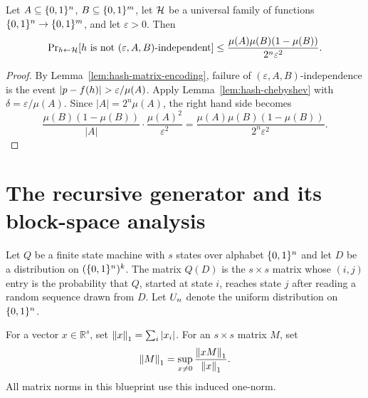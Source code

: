 \begin{lemma}
  \label{lem:universal-hash-independence}
  Let $A \subseteq \{0,1\}^n$, $B \subseteq \{0,1\}^m$, let $\mathcal{H}$ be a universal
  family of functions $\{0,1\}^n \to \{0,1\}^m$, and let $\varepsilon>0$. Then
  \[
    \operatorname{Pr}_{h \leftarrow \mathcal{H}}
    [h \text{ is not }(\varepsilon,A,B)\text{-independent}]
    \le
    \frac{\mu(A)\mu(B)(1-\mu(B))}{2^n\varepsilon^2}.
  \]
\end{lemma}
\begin{proof}
  By Lemma~\ref{lem:hash-matrix-encoding}, failure of
  $(\varepsilon,A,B)$-independence is the event
  $\abs{p-f(h)}>\varepsilon/\mu(A)$. Apply
  Lemma~\ref{lem:hash-chebyshev} with
  $\delta=\varepsilon/\mu(A)$. Since $|A|=2^n\mu(A)$, the right hand side
  becomes
  \[
    \frac{\mu(B)(1-\mu(B))}{|A|}\cdot\frac{\mu(A)^2}{\varepsilon^2}
    =\frac{\mu(A)\mu(B)(1-\mu(B))}{2^n\varepsilon^2}.
  \]
\end{proof}

\chapter{The recursive generator and its block-space analysis}

\begin{definition}
  \label{def:q-distribution}
  Let $Q$ be a finite state machine with $s$ states over alphabet $\{0,1\}^n$ and
  let $D$ be a distribution on $(\{0,1\}^n)^k$. The matrix $Q(D)$ is the
  $s \times s$ matrix whose $(i,j)$ entry is the probability that $Q$, started
  at state $i$, reaches state $j$ after reading a random sequence drawn from
  $D$. Let $U_n$ denote the uniform distribution on $\{0,1\}^n$.
\end{definition}

\begin{definition}
  \label{def:one-norms}
  For a vector $x \in \mathbb R^s$, set $\left\|x\right\|_1=\sum_i |x_i|$. For an
  $s \times s$ matrix $M$, set
  \[
    \left\|M\right\|_1=\sup_{x \ne 0}\frac{\left\|xM\right\|_1}{\left\|x\right\|_1}.
  \]
  All matrix norms in this blueprint use this induced one-norm.
\end{definition}

